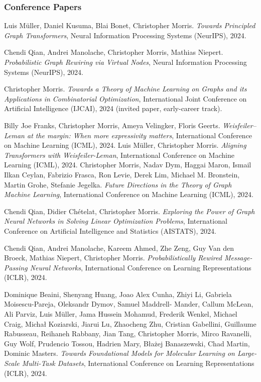\documentclass[11pt, a4paper, DIV=14, headings=small]{scrartcl}
\begin{document}
	\begin{thebibliography}{15}
		\subsubsection*{Conference Papers}
		
		Luis Müller, Daniel Kusuma, Blai Bonet, Christopher Morris.
		\emph{Towards Principled Graph Transformers},
		Neural Information Processing Systems (NeurIPS), 2024.		
		
		Chendi Qian, Andrei Manolache, Christopher Morris, Mathias Niepert.
		\emph{Probabilistic Graph Rewiring via Virtual Nodes}, 
		Neural Information Processing Systems (NeurIPS), 2024.		
		
		Christopher Morris. \emph{Towards a Theory of Machine Learning on Graphs and its Applications in Combinatorial Optimization}, International Joint Conference on Artificial Intelligence (IJCAI), 2024 (invited paper, early-career track).		
		
		 Billy Joe Franks, Christopher Morris, Ameya Velingker, Floris Geerts. \emph{Weisfeiler–Leman at the margin: When more expressivity matters}, International Conference on Machine Learning (ICML), 2024.
	Luis Müller, Christopher Morris. \emph{Aligning Transformers with Weisfeiler-Leman}, International Conference on Machine Learning (ICML), 2024.
		Christopher Morris, Nadav Dym, Haggai Maron, Ismail Ilkan Ceylan, Fabrizio Frasca, Ron Levie, Derek Lim, Michael M. Bronstein, Martin Grohe, Stefanie Jegelka.
\emph{Future Directions in the Theory of Graph Machine Learning},  International Conference on Machine Learning (ICML), 2024.
		
		Chendi Qian, Didier Chételat, Christopher Morris.
		\emph{Exploring the Power of Graph Neural Networks in Solving Linear Optimization Problems},
		International Conference on Artificial Intelligence and Statistics (AISTATS), 2024.		
		
		Chendi Qian, Andrei Manolache, Kareem Ahmed, Zhe Zeng, Guy Van den Broeck, Mathias Niepert, Christopher Morris.
		\emph{Probabilistically Rewired Message-Passing Neural Networks}, 
		International Conference on Learning Representations (ICLR), 2024.		
		
		Dominique Beaini, Shenyang Huang, Joao Alex Cunha, Zhiyi Li, Gabriela Moisescu-Pareja, Oleksandr Dymov, Samuel Maddrell-	      Mander, Callum McLean, Ali Parviz, Luis Müller, Jama Hussein Mohamud, Frederik Wenkel, Michael Craig, Michał Koziarski, Jiarui Lu, Zhaocheng Zhu, Cristian Gabellini, Guillaume Rabusseau, Reihaneh Rabbany, Jian Tang, Christopher Morris, Mirco Ravanelli, Guy Wolf, Prudencio Tossou, Hadrien Mary, B\l{}a\.z{}ej Banaszewski, Chad Martin, Dominic Masters.
		\emph{Towards Foundational Models for Molecular Learning on Large-Scale Multi-Task Datasets}, 
		International Conference on Learning Representations (ICLR), 2024.
		

\end{thebibliography}
\end{document}
